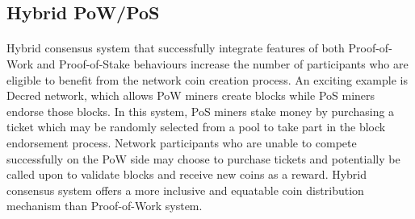\subsection{Hybrid PoW/PoS}
	\paragraph{}{
		Hybrid consensus system that successfully integrate features of both Proof-of-Work and Proof-of-Stake behaviours increase the number of participants who are eligible to benefit from the network coin creation process. An exciting example is Decred network, which allows PoW miners create blocks while PoS miners endorse those blocks. In this system, PoS miners stake money by purchasing a ticket which may be randomly selected from a pool to take part in the block endorsement process. Network participants who are unable to compete successfully on the PoW side may choose to purchase tickets and potentially be called upon to validate blocks and receive new coins as a reward. Hybrid consensus system offers a more inclusive and equatable coin distribution mechanism than Proof-of-Work system. 
	}
	
	










 